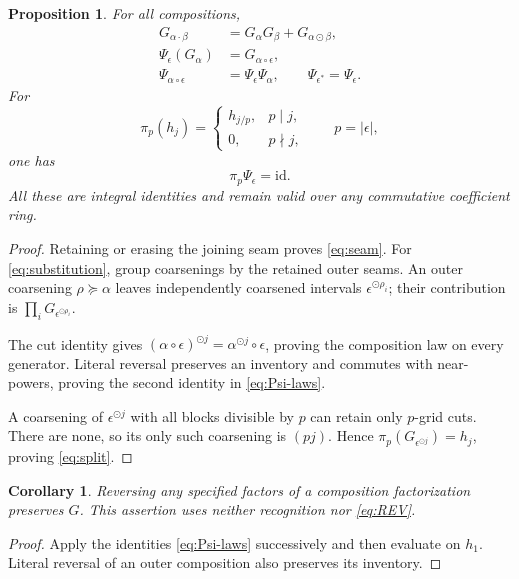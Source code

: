 \documentclass[11pt,a4paper]{amsart}
\numberwithin{equation}{section}
\theoremstyle{plain}
\newtheorem{proposition}[theorem]{Proposition}
\newtheorem{corollary}[theorem]{Corollary}
\theoremstyle{definition}
\begin{document}
\begin{proposition}\label{prop:unsigned}
For all compositions,
\begin{align}
G_{\alpha\cdot\beta}&=G_\alpha G_\beta+G_{\alpha\odot\beta},
\label{eq:seam}\\
\Psi_\epsilon(G_\alpha)&=G_{\alpha\circ\epsilon},
\label{eq:substitution}\\
\Psi_{\alpha\circ\epsilon}&=\Psi_\epsilon\Psi_\alpha,
\qquad \Psi_{\epsilon^*}=\Psi_\epsilon.
\label{eq:Psi-laws}
\end{align}
For
\begin{equation}\label{eq:projection}
\pi_p(h_j)=
\begin{cases}h_{j/p},&p\mid j,\\0,&p\nmid j,\end{cases}
\qquad p=|\epsilon|,
\end{equation}
one has
\begin{equation}\label{eq:split}
\pi_p\Psi_\epsilon=\mathrm{id}.
\end{equation}
All these are integral identities and remain valid over any commutative
coefficient ring.
\end{proposition}
\begin{proof}
Retaining or erasing the joining seam proves \eqref{eq:seam}.
For \eqref{eq:substitution}, group coarsenings by the retained outer seams.
An outer coarsening \(\rho\succeq\alpha\) leaves independently coarsened
intervals \(\epsilon^{\odot\rho_i}\); their contribution is
\(\prod_iG_{\epsilon^{\odot\rho_i}}\).

The cut identity gives
\((\alpha\circ\epsilon)^{\odot j}=\alpha^{\odot j}\circ\epsilon\),
proving the composition law on every generator.  Literal reversal preserves
an inventory and commutes with near-powers, proving the second identity
in \eqref{eq:Psi-laws}.

A coarsening of \(\epsilon^{\odot j}\) with all blocks divisible by \(p\) can
retain only \(p\)-grid cuts.  There are none, so its only such coarsening is
\((pj)\).  Hence \(\pi_p(G_{\epsilon^{\odot j}})=h_j\), proving \eqref{eq:split}.
\end{proof}

\begin{corollary}\label{cor:reversal-suffices}
Reversing any specified factors of a composition factorization preserves
\(G\).  This assertion uses neither recognition nor \eqref{eq:REV}.
\end{corollary}
\begin{proof}
Apply the identities \eqref{eq:Psi-laws} successively and then evaluate on
\(h_1\).  Literal reversal of an outer composition also preserves its inventory.
\end{proof}
\end{document}
